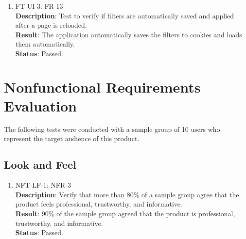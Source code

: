 \documentclass[12pt, titlepage]{article}
\begin{document}
\begin{enumerate}
    \item FT-UI-3: FR-13\\
    \textbf{Description}: Test to verify if filters are automatically saved and applied after a page is reloaded.\\
    \textbf{Result}: The application automatically saves the filters to cookies and loads them automatically.\\
    \textbf{Status}: Passed.\\
\end{enumerate}

\section{Nonfunctional Requirements Evaluation}
The following tests were conducted with a sample group of 10 users who represent the target audience of this product.
\subsection{Look and Feel}
\begin{enumerate}
    \item NFT-LF-1: NFR-3\\
    \textbf{Description}: Verify that more than 80\% of a sample group agree that the product feels professional, trustworthy, and informative.\\
    \textbf{Result}: 90\% of the sample group agreed that the product is professional, trustworthy, and informative.\\
    \textbf{Status}: Passed.\\
\end{enumerate}
		
\end{document}
